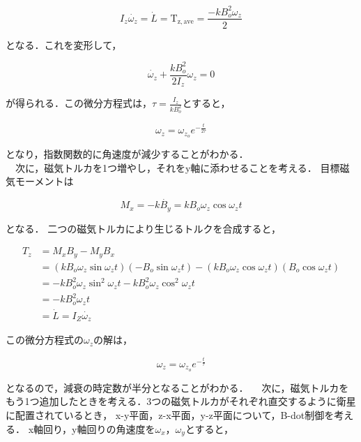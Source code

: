 \begin{equation}
    I_z\dot{\omega_z} = \dot{L} = \mathrm{T_\mathrm{z,ave}} = \frac{-kB_o^2\omega_z}{2}
\end{equation}

となる．これを変形して，

\begin{equation}
    \dot{\omega_z}+\frac{kB_o^2}{2I_z}\omega_z = 0
\end{equation}

が得られる．この微分方程式は，$\tau=\frac{I_z}{kB_o^2}$とすると，

\begin{equation}
    \omega_z = \omega_{z_o}e^{-\frac{t}{2\tau}} 
\end{equation}

となり，指数関数的に角速度が減少することがわかる．\\
　次に，磁気トルカを1つ増やし，それをy軸に添わせることを考える．
目標磁気モーメントは

\begin{equation}
    M_x = -k\dot{B_y} = kB_o\omega_z\cos\omega_zt
\end{equation}

となる．
二つの磁気トルカにより生じるトルクを合成すると，

\begin{equation}
    \begin{aligned}
        T_z &= M_xB_y - M_yB_x\\
            &= (kB_o\omega_z\sin\omega_zt)(-B_o\sin\omega_zt)-(kB_o\omega_z\cos\omega_zt)(B_o\cos\omega_zt)\\
            &= -kB_o^2\omega_z\sin^2\omega_zt - kB_o^2\omega_z\cos^2\omega_zt\\
            &= -kB_o^2\omega_zt\\
            &= \dot{L} = I_Z\dot{\omega_z}
    \end{aligned}
\end{equation}

この微分方程式の$\omega_z$の解は，

\begin{equation}
    \omega_z = \omega_{z_o}e^{-\frac{t}{\tau}} 
\end{equation}

となるので，減衰の時定数が半分となることがわかる．
　次に，磁気トルカをもう1つ追加したときを考える．3つの磁気トルカがそれぞれ直交するように衛星に配置されているとき，
x-y平面，z-x平面，y-z平面について，B-dot制御を考える．
x軸回り，y軸回りの角速度を$\omega_x$，$\omega_y$とすると，

